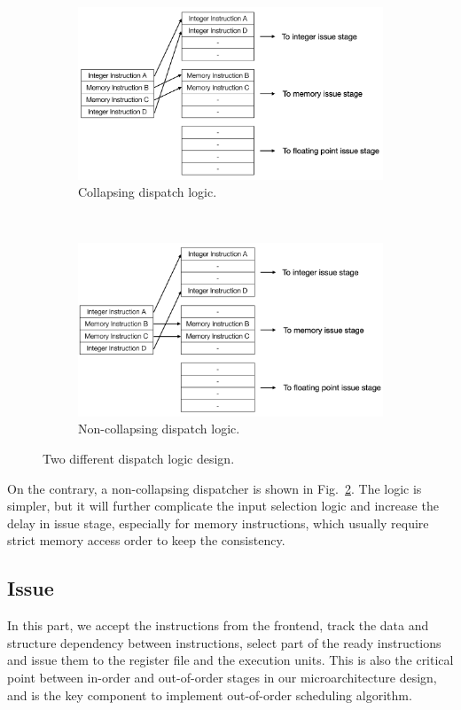\begin{figure}[!htp]
    \centering
    \begin{subfigure}{0.45\textwidth}
        \includegraphics[width=\textwidth]{figure/dispatch.png}
        \caption{Collapsing dispatch logic.}
        \label{fig:dp-1}
    \end{subfigure}
    ~
    \begin{subfigure}{0.45\textwidth}
        \includegraphics[width=\textwidth]{figure/dispatch-nc.png}
        \caption{Non-collapsing dispatch logic.}
        \label{fig:dp-2}
    \end{subfigure}
    \caption{Two different dispatch logic design.}
    \label{fig:dispatch}
\end{figure}

On the contrary, a non-collapsing dispatcher is shown in Fig.~\ref{fig:dp-2}. The logic is simpler, but it will further complicate the input selection logic and increase the delay in issue stage, especially for memory instructions, which usually require strict memory access order to keep the consistency.


\subsection{Issue} %
In this part, we accept the instructions from the frontend, track the data and structure dependency between instructions, select part of the ready instructions and issue them to the register file and the execution units. This is also the critical point between in-order and out-of-order stages in our microarchitecture design, and is the key component to implement out-of-order scheduling algorithm.

